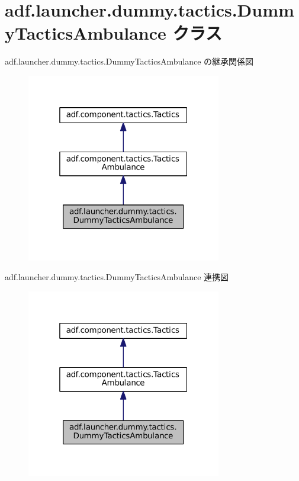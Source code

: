 \hypertarget{classadf_1_1launcher_1_1dummy_1_1tactics_1_1DummyTacticsAmbulance}{}\section{adf.\+launcher.\+dummy.\+tactics.\+Dummy\+Tactics\+Ambulance クラス}
\label{classadf_1_1launcher_1_1dummy_1_1tactics_1_1DummyTacticsAmbulance}


adf.\+launcher.\+dummy.\+tactics.\+Dummy\+Tactics\+Ambulance の継承関係図
\nopagebreak
\begin{figure}[H]
\begin{center}
\leavevmode
\includegraphics[width=241pt]{classadf_1_1launcher_1_1dummy_1_1tactics_1_1DummyTacticsAmbulance__inherit__graph}
\end{center}
\end{figure}


adf.\+launcher.\+dummy.\+tactics.\+Dummy\+Tactics\+Ambulance 連携図
\nopagebreak
\begin{figure}[H]
\begin{center}
\leavevmode
\includegraphics[width=241pt]{classadf_1_1launcher_1_1dummy_1_1tactics_1_1DummyTacticsAmbulance__coll__graph}
\end{center}
\end{figure}
